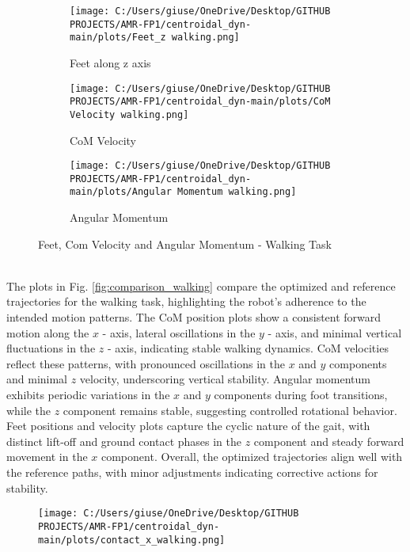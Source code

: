 \documentclass[main.tex]{subfiles}
\begin{document}
\begin{sloppypar}
\begin{figure}[htbp]
    \centering
    \begin{subfigure}[b]{0.32\textwidth}
        \centering
        \texttt{[image: C:/Users/giuse/OneDrive/Desktop/GITHUB PROJECTS/AMR-FP1/centroidal\_dyn-main/plots/Feet\_z walking.png]}
        \caption{Feet along z axis}
        \label{fig:feet_z_walking}
    \end{subfigure}
    \hfill
    \begin{subfigure}[b]{0.32\textwidth}
        \centering
        \texttt{[image: C:/Users/giuse/OneDrive/Desktop/GITHUB PROJECTS/AMR-FP1/centroidal\_dyn-main/plots/CoM Velocity walking.png]}
        \caption{CoM Velocity}
        \label{fig:com_velocity_walking}
    \end{subfigure}
    \hfill
    \begin{subfigure}[b]{0.32\textwidth}
        \centering
        \texttt{[image: C:/Users/giuse/OneDrive/Desktop/GITHUB PROJECTS/AMR-FP1/centroidal\_dyn-main/plots/Angular Momentum walking.png]}
        \caption{Angular Momentum}
        \label{fig:angular_momentum_walking}
    \end{subfigure}
    \caption{Feet, Com Velocity and Angular Momentum - Walking Task}
    \label{fig:threeimages_walking}
\end{figure}
\\
The plots in Fig. \ref{fig:comparison_walking} compare the optimized and reference trajectories for the walking task, highlighting the robot’s adherence to the intended motion patterns. The CoM position plots show a consistent forward motion along the $x$ - axis, lateral oscillations in the $y$ - axis, and minimal vertical fluctuations in the $z$ - axis, indicating stable walking dynamics. CoM velocities reflect these patterns, with pronounced oscillations in the $x$ and $y$ components and minimal $z$ velocity, underscoring vertical stability.
Angular momentum exhibits periodic variations in the $x$ and $y$ components during foot transitions, while the $z$ component remains stable, suggesting controlled rotational behavior. Feet positions and velocity plots capture the cyclic nature of the gait, with distinct lift-off and ground contact phases in the $z$ component and steady forward movement in the $x$ component. Overall, the optimized trajectories align well with the reference paths, with minor adjustments indicating corrective actions for stability.
\begin{figure}[htbp]
    \centering
    \texttt{[image: C:/Users/giuse/OneDrive/Desktop/GITHUB PROJECTS/AMR-FP1/centroidal\_dyn-main/plots/contact\_x\_walking.png]}

\end{figure}
\end{sloppypar}
\end{document}

